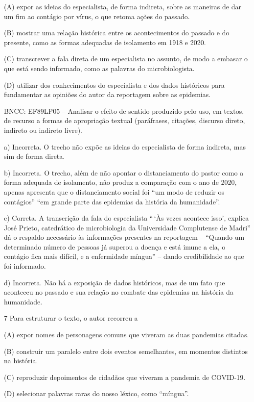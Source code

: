 \begin{itemize}
\begin{itemize}
{\begin{itemize}
\begin{itemize}
\begin{escolha}
\begin{escolha}
\begin{escolha}
\begin{escolha}
\begin{escolha}
(A) expor as ideias do especialista, de forma indireta, sobre as
maneiras de dar um fim ao contágio por vírus, o que retoma ações do
passado.

(B) mostrar uma relação histórica entre os acontecimentos do passado e
do presente, como as formas adequadas de isolamento em 1918 e 2020.

(C) transcrever a fala direta de um especialista no assunto, de modo a
embasar o que está sendo informado, como as palavras do microbiologista.

(D) utilizar dos conhecimentos do especialista e dos dados históricos
para fundamentar as opiniões do autor da reportagem sobre as epidemias.

BNCC: EF89LP05 -- Analisar o efeito de sentido produzido pelo uso, em
textos, de recurso a formas de apropriação textual (paráfrases,
citações, discurso direto, indireto ou indireto livre).

a) Incorreta. O trecho não expõe as ideias do especialista de forma
indireta, mas sim de forma direta.

b) Incorreta. O trecho, além de não apontar o distanciamento do pastor
como a forma adequada de isolamento, não produz a comparação com o ano
de 2020, apenas apresenta que o distanciamento social foi ``um modo de
reduzir os contágios'' ``em grande parte das epidemias da história da
humanidade''.

c) Correta. A transcrição da fala do especialista ``\,`Às vezes acontece
isso', explica José Prieto, catedrático de microbiologia da Universidade
Complutense de Madri'' dá o respaldo necessário às informações presentes
na reportagem -- ``Quando um determinado número de pessoas já superou a
doença e está imune a ela, o contágio fica mais difícil, e a enfermidade
míngua'' -- dando credibilidade ao que foi informado.

d) Incorreta. Não há a exposição de dados históricos, mas de um fato que
aconteceu no passado e sua relação no combate das epidemias na história
da humanidade.

\num{7} Para estruturar o texto, o autor recorreu a

(A) expor nomes de personagens comuns que viveram as duas pandemias
citadas.

(B) construir um paralelo entre dois eventos semelhantes, em momentos
distintos na história.

(C) reproduzir depoimentos de cidadãos que viveram a pandemia de
COVID-19.

(D) selecionar palavras raras do nosso léxico, como ``míngua''.


\end{escolha}
\end{escolha}
\end{escolha}
\end{escolha}
\end{escolha}
\end{itemize}
\end{itemize}}
\end{itemize}
\end{itemize}
